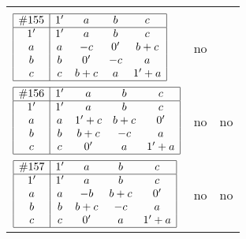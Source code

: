 \documentclass[12pt]{article}
\theoremstyle{definition}
\newcommand{\join}{\mathbin{+}}%
\newcommand{\id}{{1'}}%
\renewcommand{\div}{0'}
\begin{document}
\begin{center}
\begin{longtable}{l|c|c}
{\begin{tikzpicture}[<->,shorten <=1pt,shorten >=1pt,label distance=0mm, font=\small]
\end{tikzpicture}
}      \\[15mm]

$
\begin{array}{|c|cccc|} \hline
\#155 & \id & a & b & c \\ \hline
\id & \id & a & b & c \\
a & a & -c & \div & b \join c \\
b & b & \div & -c & a \\
c & c & b \join c & a & \id \join a \\ \hline
\end{array}
$
 & no  
 & \adjustbox{valign=c, max height=1.6cm}{$
\left[ \begin{array}{cccccc}
\id & a & a & b & c & b \\ 
a & \id & a & a & b & c \\ 
a & a & \id & b & c & b \\ 
b & a & b & \id & a & b \\ 
c & b & c & a & \id & a \\ 
b & c & b & b & a & \id
\end{array}\right]
$}      \\[15mm]

$
\begin{array}{|c|cccc|} \hline
\#156 & \id & a & b & c \\ \hline
\id & \id & a & b & c \\
a & a & \id \join c & b \join c & \div \\
b & b & b \join c & -c & a \\
c & c & \div & a & \id \join a \\ \hline
\end{array}
$
 & no  
 & no      \\[15mm]

$
\begin{array}{|c|cccc|} \hline
\#157 & \id & a & b & c \\ \hline
\id & \id & a & b & c \\
a & a & -b & b \join c & \div \\
b & b & b \join c & -c & a \\
c & c & \div & a & \id \join a \\ \hline
\end{array}
$
 & no  
 & no      \\[15mm]


\end{longtable}
\end{center}
\end{document}
